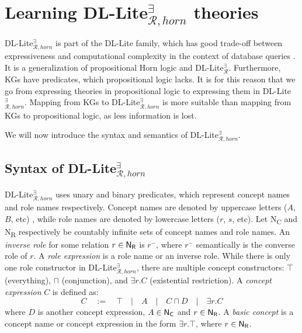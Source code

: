 \chapter{Learning DL-Lite$_{\mathcal{R}, horn}^{\exists}$ theories}

DL-Lite$_{\mathcal{R}, horn}^{\exists}$ is part of the DL-Lite family, which has good trade-off between expressiveness and computational complexity in the context of database queries \cite{borgida2008explanation}. It is a generalization of propositional Horn logic and DL-Lite$_{\mathcal{R}}^{\exists}$. Furthermore, KGs have predicates, which propositional logic lacks. It is for this reason that we go from expressing theories in propositional logic to expressing them in  DL-Lite$_{\mathcal{R}, horn}^{\exists}$. Mapping from KGs to DL-Lite$_{\mathcal{R}, horn}^{\exists}$ is more suitable than mapping from KGs to propositional logic, as less information is lost. 

We will now introduce the syntax and semantics of DL-Lite$_{\mathcal{R}, horn}^{\exists}$.

\section{Syntax of DL-Lite$_{\mathcal{R}, horn}^{\exists}$}
DL-Lite$_{\mathcal{R}, horn}^{\exists}$ uses unary and binary predicates, which represent concept names and role names respectively. Concept names are denoted by uppercase letters ($A$, $B$, etc) , while role names are denoted by lowercase letters ($r$, $s$, etc). Let \textsf{N\textsubscript{C}} and \textsf{N\textsubscript{R}} respectively be countably infinite sets of concept names and role names. An \emph{inverse role} for some relation $r \in \textsf{N\textsubscript{R}}$ is $r^-$, where $r^-$ semantically is the converse role of $r$. A \emph{role expression} is a role name or an inverse role. While there is only one role constructor in DL-Lite$_{\mathcal{R}, horn}^{\exists}$, there are multiple concept constructors: $\top$ (everything), $\sqcap$ (conjunction), and $\exists r.C$ (existential restriction). A \emph{concept expression} $C$ is defined as:
\[C \quad:=\quad \top\quad|\quad A \quad|\quad C\sqcap D\quad |\quad \exists r.C\]
where $D$ is another concept expression, $A\in \textsf{N\textsubscript{C}}$ and $r \in \textsf{N\textsubscript{R}}$. A \emph{basic concept} is a concept name or concept expression in the form $\exists r.\top$, where $r \in \textsf{N\textsubscript{R}}$. 


